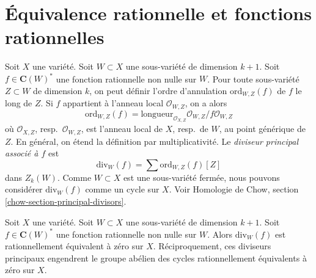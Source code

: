 \section{Équivalence rationnelle et fonctions rationnelles}
\label{section-alternative}

\noindent
Soit $X$ une variété. Soit $W \subset X$ une sous-variété
de dimension $k + 1$. Soit $f \in \mathbf{C}(W)^*$ une fonction rationnelle non nulle
sur $W$. Pour toute sous-variété $Z \subset W$ de dimension $k$,
on peut définir l'ordre d'annulation $\text{ord}_{W, Z}(f)$ de $f$ le long de
$Z$. Si $f$ appartient à l'anneau local $\mathcal{O}_{W, Z}$,
on a alors
$$
\text{ord}_{W, Z}(f) =
\text{longueur}_{\mathcal{O}_{X, Z}} \mathcal{O}_{W, Z}/f\mathcal{O}_{W, Z}
$$
où $\mathcal{O}_{X, Z}$, resp.\ $\mathcal{O}_{W, Z}$, est l'anneau
local de $X$, resp.\ de $W$, au point générique de $Z$. En général, on
étend la définition par multiplicativité. Le {\it diviseur principal
associé à $f$} est
$$
\text{div}_W(f) = \sum \text{ord}_{W, Z}(f)[Z]
$$
dans $Z_k(W)$. Comme $W \subset X$ est une sous-variété fermée, nous pouvons considérer
$\text{div}_W(f)$ comme un cycle sur $X$.
Voir Homologie de Chow, section \ref{chow-section-principal-divisors}.

\begin{lemma}
\label{lemma-rational-equivalence}
Soit $X$ une variété. Soit $W \subset X$ une sous-variété
de dimension $k + 1$. Soit $f \in \mathbf{C}(W)^*$ une fonction rationnelle non nulle
sur $W$. Alors $\text{div}_W(f)$ est rationnellement équivalent à zéro sur
$X$. Réciproquement, ces diviseurs principaux engendrent le groupe abélien des
cycles rationnellement équivalents à zéro sur $X$.
\end{lemma}

